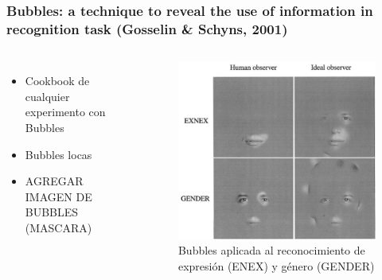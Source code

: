 \documentclass{beamer}
\begin{document}
	\begin{frame}
	\frametitle{Bubbles: a technique to reveal the use of information in recognition task (Gosselin \& Schyns, 2001)}
	\begin{columns}[t]
	  
	    \begin{itemize}
	    \item Cookbook de cualquier experimento con Bubbles
	    \item Bubbles locas
	    \item AGREGAR IMAGEN DE BUBBLES (MASCARA)
	    \end{itemize}
	  
	  \begin{figure}
	  \includegraphics[width=\textwidth]{graficos/gosselin2.png}
	\caption{Bubbles aplicada al reconocimiento de expresión (ENEX) y género (GENDER)}
	  \end{figure}
	  \end{columns}
	\end{frame}
\end{document}
